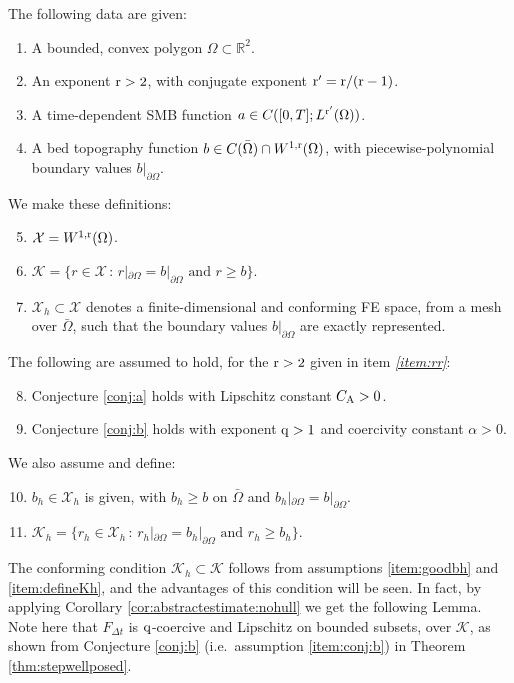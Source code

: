\documentclass[hidelinks,onefignum,onetabnum,final]{siamart220329}  %
\newcommand{\RR}{\mathbb{R}}
\newcommand{\cK}{\mathcal{K}}
\newcommand{\cX}{\mathcal{X}}
\newcommand{\qq}{{\text{\textnormal{q}}}}
\newcommand{\rr}{{\text{\textnormal{r}}}}
\newcommand{\CA}{C_\text{\textnormal{A}}}
\begin{document}
\smallskip
\begin{assumptions}
The following data are given:
\begin{enumerate}
\item A bounded, convex polygon $\Omega\subset\RR^2$.
\item An exponent $\rr > 2$, with conjugate exponent $\rr' = \rr/(\rr-1)$. \label{item:rr}
\item A time-dependent SMB function $a\in C([0,T]; L^{\rr'}(\Omega))$.
\item A bed topography function $b \in C(\bar\Omega) \cap W^{1,\rr}(\Omega)$, with piecewise-polynomial boundary values $b|_{\partial\Omega}$.
\end{enumerate}
We make these definitions:
\begin{enumerate}
\setcounter{enumi}{4}
\item $\cX = W^{1,\rr}(\Omega)$.
\item $\cK = \{r\in\cX\,:\,r|_{\partial \Omega} = b|_{\partial \Omega} \text{ and } r \ge b\}$.
\item $\cX_h \subset \cX$ denotes a finite-dimensional and conforming FE space, from a mesh over $\bar\Omega$, such that the boundary values $b|_{\partial\Omega}$ are exactly represented.
\end{enumerate}
The following are assumed to hold, for the $\rr > 2$ given in item \emph{\ref{item:rr}}:
\begin{enumerate}
\setcounter{enumi}{7}
\item Conjecture \ref{conj:a} holds with Lipschitz constant $\CA > 0$. \label{item:conj:a}
\item Conjecture \ref{conj:b} holds with exponent $\qq>1$ and coercivity constant $\alpha > 0$.\label{item:conj:b}
\end{enumerate}
We also assume and define:
\begin{enumerate}
\setcounter{enumi}{9}
\item $b_h\in\cX_h$ is given, with $b_h\ge b$ on $\bar\Omega$ and $b_h|_{\partial \Omega} = b|_{\partial \Omega}$. \label{item:goodbh}
\item $\cK_h = \{r_h\in\cX_h\,:\,r_h|_{\partial \Omega} = b_h|_{\partial \Omega} \text{ and } r_h \ge b_h\}$. \label{item:defineKh}
\end{enumerate}
\end{assumptions}

\medskip
The conforming condition $\cK_h\subset \cK$ follows from assumptions \ref{item:goodbh} and \ref{item:defineKh}, and the advantages of this condition will be seen.  In fact, by applying Corollary \ref{cor:abstractestimate:nohull} we get the following Lemma.  Note here that $F_{\Delta t}$ is $\qq$-coercive and Lipschitz on bounded subsets, over $\cK$, as shown from Conjecture \ref{conj:b} (i.e.~assumption \ref{item:conj:b}) in Theorem \ref{thm:stepwellposed}.
\end{document}
